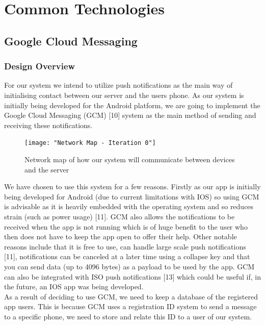 \documentclass{article}
\begin{document}
	\section{Common Technologies}
	
	\subsection{Google Cloud Messaging}
	
		\subsubsection{Design Overview}
		For our system we intend to utilize push notifications as the main way of initialising contact between our server and the users phone. As our system is initially being developed for the Android platform, we are going to implement the Google Cloud Messaging (GCM) [10] system as the main method of sending and receiving these notifications.\\
		
	\begin{figure}[H]
		\centering
		\texttt{[image: "Network Map - 	Iteration 0"]}
		\caption{Network map of how our system will communicate between devices and the server}
	\end{figure}
	
		We have chosen to use this system for a few reasons. Firstly as our app is initially being developed for Android (due to current limitations with IOS) so using GCM is advisable as it is heavily embedded with the operating system and so reduces strain (such as power usage) [11]. GCM also allows the notifications to be received when the app is not running which is of huge benefit to the user who then does not have to keep the app open to offer their help. Other notable reasons include that it is free to use, can handle large scale push notifications [11], notifications can be canceled at a later time using a collapse key and that you can send data (up to 4096 bytes) as a payload to be used by the app. GCM can also be integrated with ISO push notifications [13] which could be useful if, in the future, an IOS app was being developed.\\

		As a result of deciding to use GCM, we need to keep a database of the registered app users. This is because GCM uses a registration ID system to send a message to a specific phone, we need to store and relate this ID to a user of our system.\\
		
\end{document}
